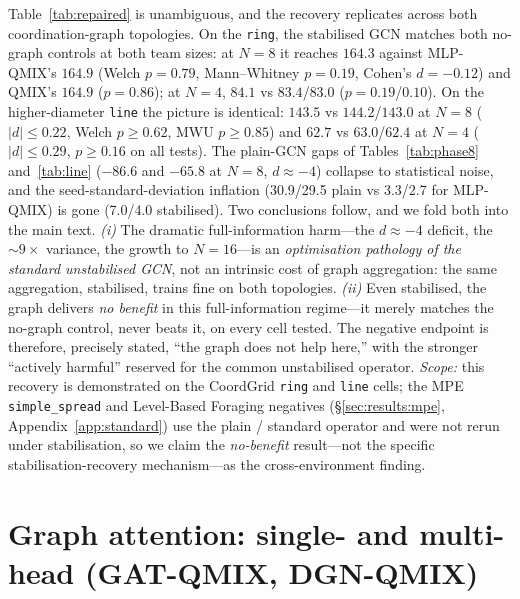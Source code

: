 \documentclass[10pt]{article}
\newcommand{\algoname}[1]{\textsc{#1}}
\newcommand{\qmix}{\algoname{QMIX}}
\newcommand{\mlpqmix}{\algoname{MLP-QMIX}}
\begin{document}
Table~\ref{tab:repaired} is unambiguous, and the recovery replicates across
both coordination-graph topologies. On the \texttt{ring}, the stabilised GCN
matches both
no-graph controls at both team sizes: at $N{=}8$ it reaches $164.3$ against
\mlpqmix's $164.9$ (Welch $p=0.79$, Mann--Whitney $p=0.19$, Cohen's
$d=-0.12$) and \qmix's $164.9$ ($p=0.86$); at $N{=}4$, $84.1$ vs
$83.4$/$83.0$ ($p=0.19$/$0.10$). On the higher-diameter \texttt{line} the
picture is identical: $143.5$ vs $144.2$/$143.0$ at $N{=}8$ ($|d|\le0.22$,
Welch $p\ge0.62$, MWU $p\ge0.85$) and $62.7$ vs $63.0$/$62.4$ at $N{=}4$
($|d|\le0.29$, $p\ge0.16$ on all tests). The plain-GCN gaps of
Tables~\ref{tab:phase8} and~\ref{tab:line}
($-86.6$ and $-65.8$ at $N{=}8$, $d\approx-4$) collapse to statistical
noise, and the
seed-standard-deviation inflation (30.9/29.5 plain vs 3.3/2.7 for \mlpqmix)
is gone
(7.0/4.0 stabilised). Two conclusions follow, and we fold both into the main
text. \emph{(i)} The dramatic full-information harm---the $d\approx-4$
deficit, the ${\sim}9\times$ variance, the growth to $N{=}16$---is an
\emph{optimisation pathology of the standard unstabilised GCN}, not an
intrinsic cost of graph aggregation: the same aggregation, stabilised,
trains fine on both topologies. \emph{(ii)} Even stabilised, the graph
delivers \emph{no
benefit} in this full-information regime---it merely matches the no-graph
control, never beats it, on every cell tested. The negative endpoint is
therefore, precisely
stated, ``the graph does not help here,'' with the stronger ``actively
harmful'' reserved for the common unstabilised operator. \emph{Scope:} this
recovery is demonstrated on the CoordGrid \texttt{ring} and \texttt{line}
cells; the MPE
\texttt{simple\_spread} and Level-Based Foraging negatives
(\S\ref{sec:results:mpe}, Appendix~\ref{app:standard}) use the plain /
standard operator and were not rerun under stabilisation, so we claim the
\emph{no-benefit} result---not the specific stabilisation-recovery
mechanism---as the cross-environment finding.

\section{Graph attention: single- and multi-head (GAT-QMIX, DGN-QMIX)}
\label{app:gat}
\end{document}
